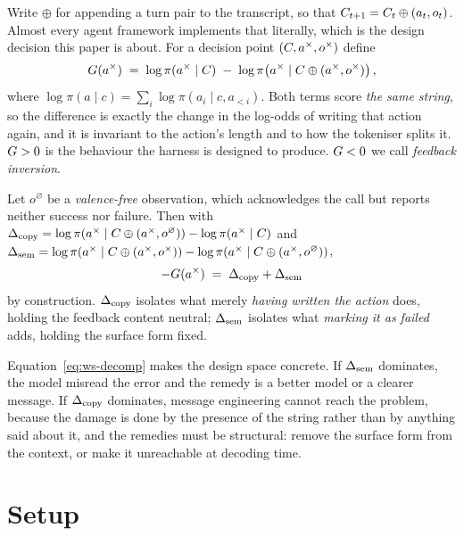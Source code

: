 Write $\oplus$ for appending a turn pair to the transcript, so that
$C_{t+1} = C_t \oplus (a_t, o_t)$. Almost every agent framework
implements that literally, which is the design decision this paper is about.
For a decision point $(C, a^{\times}, o^{\times})$ define
\begin{equation}
G(a^{\times}) \;=\; \log \pi(a^{\times} \mid C) \;-\;
\log \pi\!\left(a^{\times} \mid C \oplus (a^{\times}, o^{\times})\right),
\label{eq:ws-gain}
\end{equation}
where $\log \pi(a \mid c) = \sum_i \log \pi(a_i \mid c, a_{<i})$. Both terms
score \emph{the same string}, so the difference is exactly the change in the
log-odds of writing that action again, and it is invariant to the action's
length and to how the tokeniser splits it. $G > 0$ is the behaviour the
harness is designed to produce. $G < 0$ we call \emph{feedback inversion}.

Let $o^{\varnothing}$ be a \emph{valence-free} observation, which acknowledges
the call but reports neither success nor failure. Then with
$\Delta_{\mathrm{copy}} = \log \pi(a^{\times} \mid C \oplus (a^{\times}, o^{\varnothing}))
- \log \pi(a^{\times} \mid C)$ and
$\Delta_{\mathrm{sem}} = \log \pi(a^{\times} \mid C \oplus (a^{\times}, o^{\times}))
- \log \pi(a^{\times} \mid C \oplus (a^{\times}, o^{\varnothing}))$,
\begin{equation}
-G(a^{\times}) \;=\; \Delta_{\mathrm{copy}} + \Delta_{\mathrm{sem}}
\label{eq:ws-decomp}
\end{equation}
by construction. $\Delta_{\mathrm{copy}}$ isolates what merely \emph{having written the
action} does, holding the feedback content neutral; $\Delta_{\mathrm{sem}}$ isolates what
\emph{marking it as failed} adds, holding the surface form fixed.

Equation~\ref{eq:ws-decomp} makes the design space concrete. If $\Delta_{\mathrm{sem}}$
dominates, the model misread the error and the remedy is a better model or a
clearer message. If $\Delta_{\mathrm{copy}}$ dominates, message engineering cannot reach the
problem, because the damage is done by the presence of the string rather than
by anything said about it, and the remedies must be structural: remove the
surface form from the context, or make it unreachable at decoding time.

\section{Setup}
\label{sec:ws-setup}

